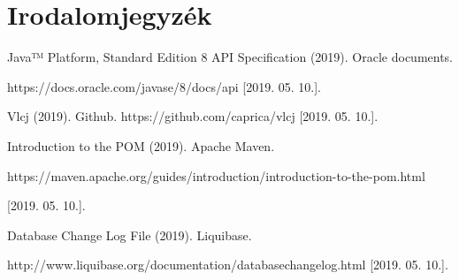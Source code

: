 \chapter*{Irodalomjegyzék}


Java™ Platform, Standard Edition 8 API Specification (2019). Oracle documents. 

https://docs.oracle.com/javase/8/docs/api
[2019. 05. 10.].

\vspace{1cm}

\setlength\parindent{0pt}
Vlcj (2019). Github.
https://github.com/caprica/vlcj [2019. 05. 10.].

\vspace{1cm}

\setlength\parindent{0pt}
Introduction to the POM (2019). Apache Maven.

https://maven.apache.org/guides/introduction/introduction-to-the-pom.html

[2019. 05. 10.].

\vspace{1cm}

\setlength\parindent{0pt}
Database Change Log File (2019). Liquibase.

http://www.liquibase.org/documentation/databasechangelog.html [2019. 05. 10.].